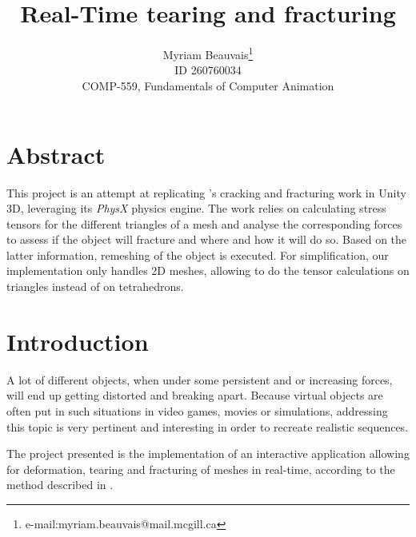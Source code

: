 \documentclass[tog]{acmsiggraph}
\title{Real-Time tearing and fracturing}
\author{Myriam Beauvais\thanks{e-mail:myriam.beauvais@mail.mcgill.ca} \\ ID 260760034 \\COMP-559, Fundamentals of Computer Animation}
\begin{document}



\maketitle

\copyrightspace

\section{Abstract}
This project is an attempt at replicating \cite{Obrien:1999:GMA}'s cracking and fracturing work in Unity 3D, leveraging its \textit{PhysX} physics engine. The work relies on calculating stress tensors for the different triangles of a mesh and analyse the corresponding forces to assess if the object will fracture and where and how it will do so. Based on the latter information, remeshing of the object is executed. For simplification, our implementation only handles 2D meshes, allowing to do the tensor calculations on triangles instead of on tetrahedrons. 

\section{Introduction}
A lot of different objects, when under some persistent and or increasing forces, will end up getting distorted and breaking apart. Because virtual objects are often put in such situations in video games, movies or simulations, addressing this topic is very pertinent and interesting in order to recreate realistic sequences.  

The project presented is the implementation of an interactive application allowing for deformation, tearing and fracturing of meshes in real-time, according to the method described in \cite{Obrien:1999:GMA}. 
\end{document}

